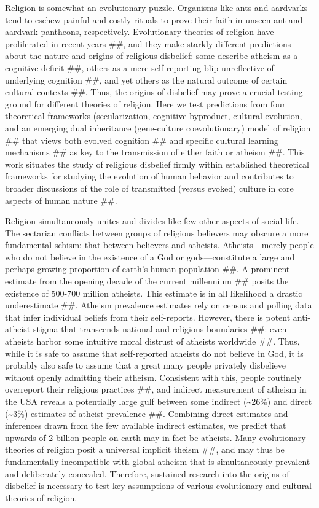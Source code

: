 \documentclass[]{article}
\begin{document}
Religion is somewhat an evolutionary puzzle. Organisms like ants and
aardvarks tend to eschew painful and costly rituals to prove their faith
in unseen ant and aardvark pantheons, respectively. Evolutionary
theories of religion have proliferated in recent years \#\#, and they
make starkly different predictions about the nature and origins of
religious disbelief: some describe atheism as a cognitive deficit \#\#,
others as a mere self-reporting blip unreflective of underlying
cognition \#\#, and yet others as the natural outcome of certain
cultural contexts \#\#. Thus, the origins of disbelief may prove a
crucial testing ground for different theories of religion. Here we test
predictions from four theoretical frameworks (secularization, cognitive
byproduct, cultural evolution, and an emerging dual inheritance
(gene-culture coevolutionary) model of religion \#\# that views both
evolved cognition \#\# and specific cultural learning mechanisms \#\# as
key to the transmission of either faith or atheism \#\#. This work
situates the study of religious disbelief firmly within established
theoretical frameworks for studying the evolution of human behavior and
contributes to broader discussions of the role of transmitted (versus
evoked) culture in core aspects of human nature \#\#.

Religion simultaneously unites and divides like few other aspects of
social life. The sectarian conflicts between groups of religious
believers may obscure a more fundamental schism: that between believers
and atheists. Atheists---merely people who do not believe in the
existence of a God or gods---constitute a large and perhaps growing
proportion of earth's human population \#\#. A prominent estimate from
the opening decade of the current millennium \#\# posits the existence
of 500-700 million atheists. This estimate is in all likelihood a
drastic underestimate \#\#. Atheism prevalence estimates rely on census
and polling data that infer individual beliefs from their self-reports.
However, there is potent anti-atheist stigma that transcends national
and religious boundaries \#\#: even atheists harbor some intuitive moral
distrust of atheists worldwide \#\#. Thus, while it is safe to assume
that self-reported atheists do not believe in God, it is probably also
safe to assume that a great many people privately disbelieve without
openly admitting their atheism. Consistent with this, people routinely
overreport their religious practices \#\#, and indirect measurement of
atheism in the USA reveals a potentially large gulf between some
indirect (\textasciitilde{}26\%) and direct (\textasciitilde{}3\%)
estimates of atheist prevalence \#\#. Combining direct estimates and
inferences drawn from the few available indirect estimates, we predict
that upwards of 2 billion people on earth may in fact be atheists. Many
evolutionary theories of religion posit a universal implicit theism
\#\#, and may thus be fundamentally incompatible with global atheism
that is simultaneously prevalent and deliberately concealed. Therefore,
sustained research into the origins of disbelief is necessary to test
key assumptions of various evolutionary and cultural theories of
religion.
\end{document}
